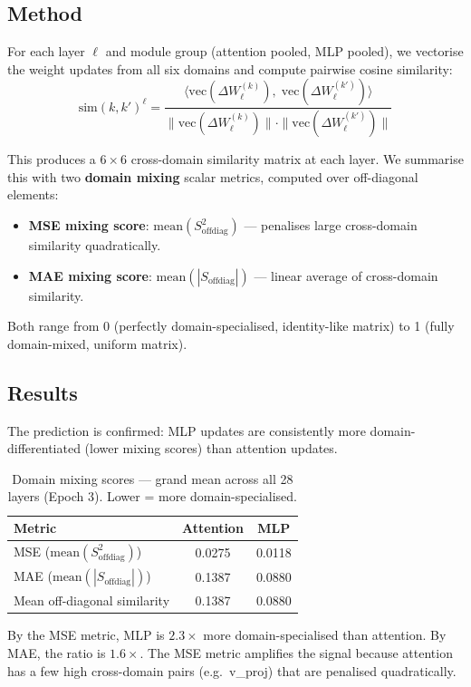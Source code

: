 \documentclass[11pt,a4paper]{article}
\begin{document}
\subsection{Method}
For each layer $\ell$ and module group (attention pooled, MLP pooled), we vectorise the weight updates from all six domains and compute pairwise cosine similarity:
\[
\text{sim}(k, k')^{\ell} = \frac{\langle \text{vec}(\Delta W_\ell^{(k)}),\; \text{vec}(\Delta W_\ell^{(k')}) \rangle}{\|\text{vec}(\Delta W_\ell^{(k)})\| \cdot \|\text{vec}(\Delta W_\ell^{(k')})\|}
\]

This produces a $6 \times 6$ cross-domain similarity matrix at each layer. We summarise this with two \textbf{domain mixing} scalar metrics, computed over off-diagonal elements:
\begin{itemize}
    \item \textbf{MSE mixing score}: $\text{mean}(S_{\text{offdiag}}^2)$ --- penalises large cross-domain similarity quadratically.
    \item \textbf{MAE mixing score}: $\text{mean}(|S_{\text{offdiag}}|)$ --- linear average of cross-domain similarity.
\end{itemize}
Both range from 0 (perfectly domain-specialised, identity-like matrix) to 1 (fully domain-mixed, uniform matrix).

\subsection{Results}

The prediction is confirmed: MLP updates are consistently more domain-differentiated (lower mixing scores) than attention updates.

\begin{table}[H]
\centering
\caption{Domain mixing scores --- grand mean across all 28 layers (Epoch 3). Lower = more domain-specialised.}
\label{tab:mixing}
\begin{tabular}{lcc}
\toprule
Metric & Attention & MLP \\
\midrule
MSE ($\text{mean}(S^2_{\text{offdiag}})$) & 0.0275 & 0.0118 \\
MAE ($\text{mean}(|S_{\text{offdiag}}|)$)  & 0.1387 & 0.0880 \\
Mean off-diagonal similarity                & 0.1387 & 0.0880 \\
\bottomrule
\end{tabular}
\end{table}

By the MSE metric, MLP is $2.3\times$ more domain-specialised than attention. By MAE, the ratio is $1.6\times$. The MSE metric amplifies the signal because attention has a few high cross-domain pairs (e.g.\ v\_proj) that are penalised quadratically.
\end{document}
